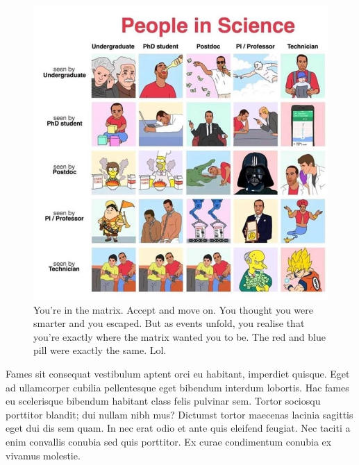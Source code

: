 \begin{figure}[!hbt]
    \centering
    \includegraphics[width=1\linewidth]{figures/chapter_1/scientists.jpeg}
    \caption[You're in the matrix.]{You're in the matrix. Accept and move on. You thought you were smarter and you escaped. But as events unfold, you realise that you're exactly where the matrix wanted you to be. The red and blue pill were exactly the same. Lol.}
    \label{fig:scientists-sigh}
\end{figure}

Fames sit consequat vestibulum aptent orci eu habitant, imperdiet quisque. Eget ad ullamcorper cubilia pellentesque eget bibendum interdum lobortis. Hac fames eu scelerisque bibendum habitant class felis pulvinar sem. Tortor sociosqu porttitor blandit; dui nullam nibh mus? Dictumst tortor maecenas lacinia sagittis eget dui dis sem quam. In nec erat odio et ante quis eleifend feugiat. Nec taciti a enim convallis conubia sed quis porttitor. Ex curae condimentum conubia ex vivamus molestie.

